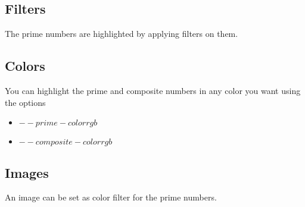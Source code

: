 \subsection{Filters}
 The prime numbers are highlighted by applying filters on them.

 \subsection{Colors}
 You can highlight the prime and composite numbers in any color you want using the options

 \begin{itemize}
	\item{$--prime-color r g b$}
	\item{$--composite-color r g b$}
\end{itemize}

\subsection{Images}
An image can be set as color filter for the prime numbers.  
